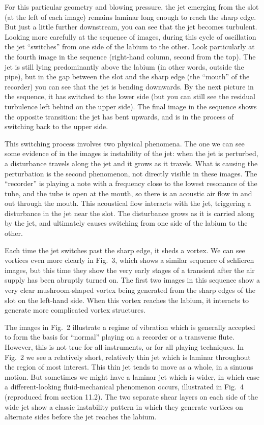   For this particular geometry and blowing pressure, the jet emerging from the 
  slot (at the left of each image) remains laminar long enough to reach the 
  sharp edge. But just a little further downstream, you can see that the jet 
  becomes turbulent. Looking more carefully at the sequence of images, during 
  this cycle of oscillation the jet “switches” from one side of the labium to 
  the other. Look particularly at the fourth image in the sequence (right-hand 
  column, second from the top). The jet is still lying predominantly above the 
  labium (in other words, outside the pipe), but in the gap between the slot 
  and the sharp edge (the “mouth” of the recorder) you can see that the jet is 
  bending downwards. By the next picture in the sequence, it has switched to 
  the lower side (but you can still see the residual turbulence left behind on 
  the upper side). The final image in the sequence shows the opposite 
  transition: the jet has bent upwards, and is in the process of switching back 
  to the upper side. 

  This switching process involves two physical phenomena. The one we can see 
  some evidence of in the images is instability of the jet: when the jet is 
  perturbed, a disturbance travels along the jet and it grows as it travels. 
  What is causing the perturbation is the second phenomenon, not directly 
  visible in these images. The “recorder” is playing a note with a frequency 
  close to the lowest resonance of the tube, and the tube is open at the mouth, 
  so there is an acoustic air flow in and out through the mouth. This 
  acoustical flow interacts with the jet, triggering a disturbance in the jet 
  near the slot. The disturbance grows as it is carried along by the jet, and 
  ultimately causes switching from one side of the labium to the other. 

  Each time the jet switches past the sharp edge, it sheds a vortex. We can see 
  vortices even more clearly in Fig.\ 3, which shows a similar sequence of 
  schlieren images, but this time they show the very early stages of a 
  transient after the air supply has been abruptly turned on. The first two 
  images in this sequence show a very clear mushroom-shaped vortex being 
  generated from the sharp edges of the slot on the left-hand side. When this 
  vortex reaches the labium, it interacts to generate more complicated vortex 
  structures. 

  The images in Fig.\ 2 illustrate a regime of vibration which is generally 
  accepted to form the basis for “normal” playing on a recorder or a transverse 
  flute. However, this is not true for all instruments, or for all playing 
  techniques. In Fig.\ 2 we see a relatively short, relatively thin jet which 
  is laminar throughout the region of most interest. This thin jet tends to 
  move as a whole, in a sinuous motion. But sometimes we might have a laminar 
  jet which is wider, in which case a different-looking fluid-mechanical 
  phenomenon occurs, illustrated in Fig.\ 4 (reproduced from section 11.2). The 
  two separate shear layers on each side of the wide jet show a classic 
  instability pattern in which they generate vortices on alternate sides before 
  the jet reaches the labium. 

